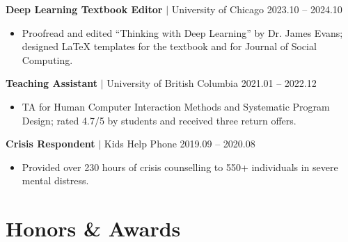 \documentclass[11pt,letterpaper]{article}
\begin{document}
\vspace{0.5em}

\noindent\textbf{Deep Learning Textbook Editor} $|$ University of Chicago \hfill 2023.10 -- 2024.10
\begin{itemize}
    \item Proofread and edited ``Thinking with Deep Learning'' by Dr. James Evans; designed LaTeX templates for the textbook and for Journal of Social Computing.
\end{itemize}

\vspace{0.5em}

\noindent\textbf{Teaching Assistant} $|$ University of British Columbia \hfill 2021.01 -- 2022.12
\begin{itemize}
    \item TA for Human Computer Interaction Methods and Systematic Program Design; rated 4.7/5 by students and received three return offers.
\end{itemize}

\vspace{0.5em}

\noindent\textbf{Crisis Respondent} $|$ Kids Help Phone \hfill 2019.09 -- 2020.08
\begin{itemize}
    \item Provided over 230 hours of crisis counselling to 550+ individuals in severe mental distress.
\end{itemize}

\section*{Honors \& Awards}
\end{document}
